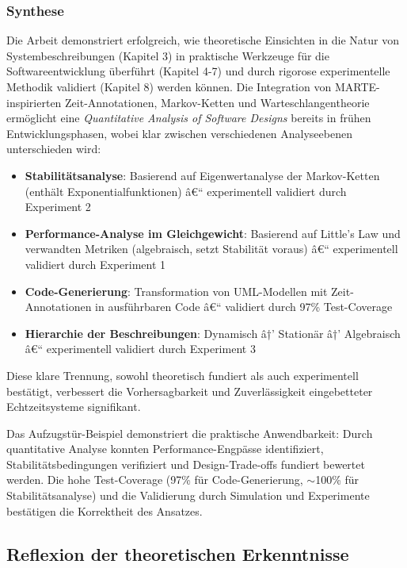 ﻿\documentclass[a4paper,12pt]{scrreprt}
\theoremstyle{definition}
\begin{document}
\subsubsection{Synthese}

Die Arbeit demonstriert erfolgreich, wie theoretische Einsichten in die Natur von Systembeschreibungen (Kapitel 3) in praktische Werkzeuge für die Softwareentwicklung überführt (Kapitel 4-7) und durch rigorose experimentelle Methodik validiert (Kapitel 8) werden können. Die Integration von MARTE-inspirierten Zeit-Annotationen, Markov-Ketten und Warteschlangentheorie ermöglicht eine \textit{Quantitative Analysis of Software Designs} bereits in frühen Entwicklungsphasen, wobei klar zwischen verschiedenen Analyseebenen unterschieden wird:

\begin{itemize}
	\item[-] \textbf{Stabilitätsanalyse}: Basierend auf Eigenwertanalyse der Markov-Ketten (enthält Exponentialfunktionen) â€“ experimentell validiert durch Experiment 2
	\item[-] \textbf{Performance-Analyse im Gleichgewicht}: Basierend auf Little's Law und verwandten Metriken (algebraisch, setzt Stabilität voraus) â€“ experimentell validiert durch Experiment 1
	\item[-] \textbf{Code-Generierung}: Transformation von UML-Modellen mit Zeit-Annotationen in ausführbaren Code â€“ validiert durch 97\% Test-Coverage
	\item[-] \textbf{Hierarchie der Beschreibungen}: Dynamisch â†’ Stationär â†’ Algebraisch â€“ experimentell validiert durch Experiment 3
\end{itemize}

Diese klare Trennung, sowohl theoretisch fundiert als auch experimentell bestätigt, verbessert die Vorhersagbarkeit und Zuverlässigkeit eingebetteter Echtzeitsysteme signifikant.

Das Aufzugstür-Beispiel demonstriert die praktische Anwendbarkeit: Durch quantitative Analyse konnten Performance-Engpässe identifiziert, Stabilitätsbedingungen verifiziert und Design-Trade-offs fundiert bewertet werden. Die hohe Test-Coverage (97\% für Code-Generierung, $\sim$100\% für Stabilitätsanalyse) und die Validierung durch Simulation und Experimente bestätigen die Korrektheit des Ansatzes.

\subsection{Reflexion der theoretischen Erkenntnisse}
\end{document}
